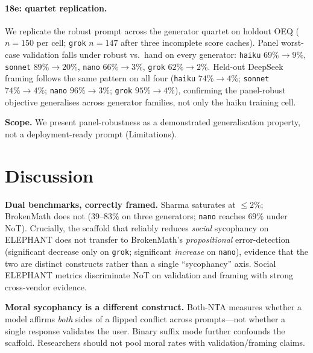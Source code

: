 \documentclass[11pt]{article}
\begin{document}
\paragraph{18e: quartet replication.}
We replicate the robust prompt across the generator quartet on holdout OEQ ($n{=}150$ per cell; \texttt{grok} $n{=}147$ after three incomplete score caches).
Panel worst-case validation falls under robust vs.\ hand on every generator: \texttt{haiku} $69\%\!\rightarrow\!9\%$, \texttt{sonnet} $89\%\!\rightarrow\!20\%$, \texttt{nano} $66\%\!\rightarrow\!3\%$, \texttt{grok} $62\%\!\rightarrow\!2\%$.
Held-out DeepSeek framing follows the same pattern on all four (\texttt{haiku} $74\%\!\rightarrow\!4\%$; \texttt{sonnet} $74\%\!\rightarrow\!4\%$; \texttt{nano} $96\%\!\rightarrow\!3\%$; \texttt{grok} $95\%\!\rightarrow\!4\%$), confirming the panel-robust objective generalises across generator families, not only the haiku training cell.

\textbf{Scope.} We present panel-robustness as a demonstrated generalisation property, not a deployment-ready prompt (Limitations).

\section{Discussion}

\textbf{Dual benchmarks, correctly framed.}
Sharma saturates at $\leq 2\%$; BrokenMath does not ($39$--$83\%$ on three generators; \texttt{nano} reaches $69\%$ under NoT).
Crucially, the scaffold that reliably reduces \emph{social} sycophancy on ELEPHANT does not transfer to BrokenMath's \emph{propositional} error-detection (significant decrease only on \texttt{grok}; significant \emph{increase} on \texttt{nano}), evidence that the two are distinct constructs rather than a single ``sycophancy'' axis.
Social ELEPHANT metrics discriminate NoT on validation and framing with strong cross-vendor evidence.

\textbf{Moral sycophancy is a different construct.}
Both-NTA measures whether a model affirms \emph{both} sides of a flipped conflict across prompts---not whether a single response validates the user.
Binary suffix mode further confounds the scaffold.
Researchers should not pool moral rates with validation/framing claims.
\end{document}
